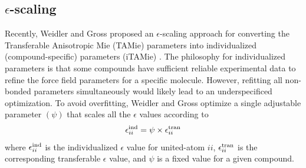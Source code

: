 \documentclass[journal=jced,manuscript=article]{achemso}
\begin{document}


\subsection{$\epsilon$-scaling} \label{sec: eps scaling methods}

Recently, Weidler and Gross proposed an $\epsilon$-scaling approach for converting the Transferable Anisotropic Mie (TAMie) parameters into individualized (compound-specific) parameters (iTAMie) \cite{Weidler2018}. The philosophy for individualized parameters is that some compounds have sufficient reliable experimental data to refine the force field parameters for a specific molecule. However, refitting all non-bonded parameters simultaneously would likely lead to an underspecificed optimization. To avoid overfitting, Weidler and Gross optimize a single adjustable parameter $(\psi)$ that scales all the $\epsilon$ values according to
\begin{equation}
\epsilon_{ii}^{\rm ind} = \psi \times \epsilon_{ii}^{\rm tran}
\end{equation}
where $\epsilon_{ii}^{\rm ind}$ is the individualized $\epsilon$ value for united-atom $ii$, $\epsilon_{ii}^{\rm tran}$ is the corresponding transferable $\epsilon$ value, and $\psi$ is a fixed value for a given compound.



\end{document}
